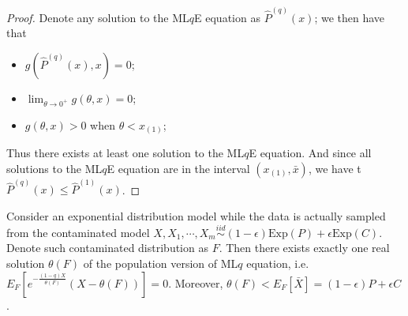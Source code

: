 \begin{proof}
Denote any solution to the ML$q$E equation as $\hat{P}^{(q)}(x)$; we then have that
\begin{itemize}
\item $g(\hat{P}^{(q)}(x), x) = 0$;
\item $\lim_{\theta \rightarrow 0^+}g(\theta, x) = 0$;
\item $g(\theta, x) > 0$ when $\theta < x_{(1)}$;
\end{itemize}

Thus there exists at least one solution to the ML$q$E equation. And since all solutions to the ML$q$E equation are in the interval $(x_{(1)},\bar{x})$, we have t$\hat{P}^{(q)}(x) \leq \hat{P}^{(1)}(x)$.
\end{proof}

\begin{lemma}
\label{lemma:PopulationLqExist}
Consider an exponential distribution model while the data is actually sampled from the contaminated model $X, X_1, \cdots, X_m \stackrel{iid}{\sim} (1-\epsilon) \mathrm{Exp}(P) + \epsilon \mathrm{Exp}(C)$. Denote such contaminated distribution as $F$.
Then there exists exactly one real solution $\theta(F)$ of the population version of ML$q$ equation,
i.e.\ $E_F[e^{-\frac{(1-q)X}{\theta(F)}}(X - \theta(F))] = 0$. Moreover, $\theta(F) < E_F[\bar{X}] = (1-\epsilon) P + \epsilon C$.
\end{lemma}
